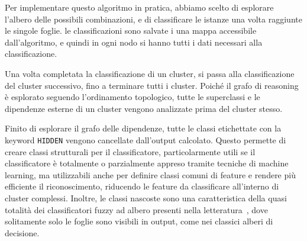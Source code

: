 Per implementare questo algoritmo in pratica, abbiamo scelto di esplorare l'albero delle possibili combinazioni, e di classificare le istanze una volta raggiunte le singole foglie. le classificazioni sono salvate i una mappa accessibile dall'algoritmo, e quindi in ogni nodo si hanno tutti i dati necessari alla classificazione.

Una volta completata la classificazione di un cluster, si passa alla classificazione del cluster successivo, fino a terminare tutti i cluster. Poiché il grafo di reasoning è esplorato seguendo l'ordinamento topologico, tutte le superclassi e le dipendenze esterne di un cluster vengono analizzate prima del cluster stesso.

Finito di esplorare il grafo delle dipendenze, tutte le classi etichettate con la keyword \verb|HIDDEN| vengono cancellate dall'output calcolato. Questo permette di creare classi strutturali per il classificatore, particolarmente utili se il classificatore è totalmente o parzialmente appreso tramite tecniche di machine learning, ma utilizzabili anche per definire classi comuni di feature e rendere più efficiente il riconoscimento, riducendo le feature da classificare all'interno di cluster complessi. Inoltre, le classi nascoste sono una caratteristica della quasi totalità dei classificatori fuzzy ad albero presenti nella letteratura~\cite{Yuan1995125}, dove solitamente solo le foglie sono visibili in output, come nei classici alberi di decisione.

